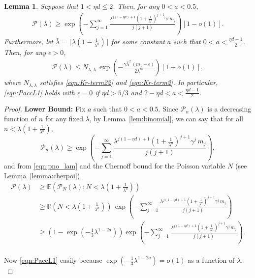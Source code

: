 \documentclass[11pt]{article}
\newcommand{\pp}{\mathbb{P}}
\newcommand{\ee}{\mathbb{E}}
\newcommand{\rbdd}{\overline{r}}
\newcommand{\lt}{\left}
\newcommand{\rt}{\right}
\newcommand{\pno}{\mathcal{P}(\lambda)}
\newcommand{\pnon}{\mathcal{P}_n(\lambda)}
\newtheorem{lemma}{Lemma}
\begin{document}
\begin{appendices}
\begin{lemma}
 \label{lem:pno-upper}
 Suppose that $1 < \eta d \leq 2$. Then, for any $0 < a < 0.5$,
\begin{align}
\label{eqn:PaccL1}
\pno  \geq \exp\left( - \sum_{j = 1}^\infty \frac{\lambda^{j(1 - \eta d)+1} \lt(1+ \frac{1}{\lambda^{a}}\rt)^{j+1}\gamma^j\, m_j}{j(j+1)}\right)\lt[ 1 - o(1) \rt].
\end{align}
Furthermore, let $\bar{\lambda} = \lceil\lambda(1 - \frac{1}{\lambda^a})\rceil$ for some constant $a$ such that $0 < a < \frac{\eta d - 1}{2}$. Then, for any $\epsilon > 0$,
\begin{align}
\label{eqn:PaccL2}
 \pno \leq N_{\lambda, \lambda} \,\exp\left( - \frac{\gamma \bar{\lambda}^2\, (m_1 - \epsilon)}{2\lambda^{\eta d}} \right) \lt[ 1 + o(1) \rt],
\end{align}
where $N_{\lambda, \lambda}$ satisfies \eqref{eqn:Kr-term22} and \eqref{eqn:Kr-term2}.  In particular, \eqref{eqn:PaccL1} holds with $\epsilon = 0$ if $\eta d > 5/3$ and
$2 - \eta d < a < \frac{\eta d - 1}{2}$.
\end{lemma}

\begin{proof}

\noindent
{\bf Lower Bound:}
Fix $a$ such that $0 < a < 0.5$. Since $\pnon$ is a decreasing function of $n$ for any fixed $\lambda$, by Lemma~\ref{lem:binomial}, we can say that for all $n < \lambda\lt(1 + \frac{1}{\lambda^a}\rt)$,
\[
  \pnon \geq \exp\left( - \sum_{j = 1}^\infty \frac{\lambda^{j(1 - \eta d)+1} \lt(1+ \frac{1}{\lambda^{a}}\rt)^{j+1}\gamma^j\, m_j}{j(j+1)}\right),
\]
and from \eqref{eqn:pno_lam} and the Chernoff bound for the Poisson variable $N$ (see Lemma~\ref{lemma:cherpoi}),
\begin{align*}
\pno  &\geq \ee\lt(\mathcal{P}_N(\lambda) ; N <  \lambda\lt(1  + \frac{1}{\lambda^a}\rt) \rt) \nonumber \\
      &\geq  \pp\lt( N <  \lambda\lt(1 + \frac{1}{\lambda^a}\rt) \rt)\,\exp\left( - \sum_{j = 1}^\infty \frac{\lambda^{j(1 - \eta d)+1} \lt(1+ \frac{1}{\lambda^{a}}\rt)^{j+1}\gamma^j\, m_j}{j(j+1)}\right) \nonumber\\
      &\geq \lt(1 - \exp\lt( - \frac{1}{3}\lambda^{1 - 2a}\rt) \rt)\exp\left( - \sum_{j = 1}^\infty \frac{\lambda^{j(1 - \eta d)+1} \lt(1+ \frac{1}{\lambda^{a}}\rt)^{j+1}\gamma^j\, m_j}{j(j+1)}\right).
\end{align*}\\
Now \eqref{eqn:PaccL1} easily because $\exp\lt( - \frac{1}{3}\lambda^{1 - 2a}\rt) = o(1)$ as a function of $\lambda$.\\


\end{proof}
\end{appendices}
\end{document}
